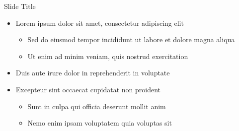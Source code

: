 \begin{frame}{Slide Title}
  \begin{itemize}
    \item Lorem ipsum dolor sit amet, consectetur adipiscing elit
    \begin{itemize}
      \item Sed do eiusmod tempor incididunt ut labore et dolore magna aliqua
      \item Ut enim ad minim veniam, quis nostrud exercitation
    \end{itemize}
    \item Duis aute irure dolor in reprehenderit in voluptate
    \item Excepteur sint occaecat cupidatat non proident
    \begin{itemize}
      \item Sunt in culpa qui officia deserunt mollit anim
      \item Nemo enim ipsam voluptatem quia voluptas sit
    \end{itemize}
  \end{itemize}
\end{frame}
